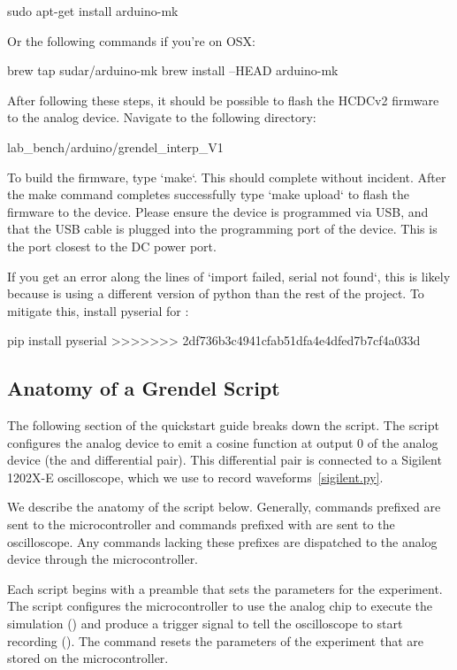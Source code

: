 \begin{snippet}
sudo apt-get install arduino-mk
\end{snippet}

Or the following commands if you're on OSX:
\begin{snippet}
brew tap sudar/arduino-mk
brew install --HEAD arduino-mk

After following these steps, it should be possible to flash the HCDCv2 firmware to the analog device. Navigate
to the following directory:
\begin{snippet}
lab_bench/arduino/grendel_interp_V1
\end{snippet}

To build the firmware, type `make`. This should complete without incident. After the make command completes 
successfully type `make upload` to flash the firmware to the device. Please ensure the device is programmed via USB,
and that the USB cable is plugged into the programming port of the device. This is the port closest to the DC power port. 

If you get an error along the lines of `import failed, serial not found`, this is likely because  is using 
a different version of python than the rest of the project. To mitigate this, install pyserial for :

\begin{snippet}
pip install pyserial
>>>>>>> 2df736b3c4941cfab51dfa4e4dfed7b7cf4a033d
\end{snippet}

\subsection{Anatomy of a Grendel Script}

The following section of the quickstart guide breaks down the 
 script. The 
script configures the analog device to emit a
cosine function at output 0 of the analog device (the  and 
differential pair). This differential pair is connected to a Sigilent 1202X-E
oscilloscope, which we use to record waveforms~\ref{sigilent.py}.

We describe the anatomy of the \grendel script below. Generally, commands
prefixed  are sent to the microcontroller and commands prefixed with
 are sent to the oscilloscope. Any commands lacking these prefixes are
dispatched to the analog device through the microcontroller.


Each \grendel script begins with a preamble that sets the parameters for the
experiment. The  script configures the microcontroller to use the
analog chip to execute the simulation () and produce a
trigger signal to tell the oscilloscope to start recording (). The 
command resets the parameters of the experiment that are stored on the
microcontroller.


\end{snippet}
